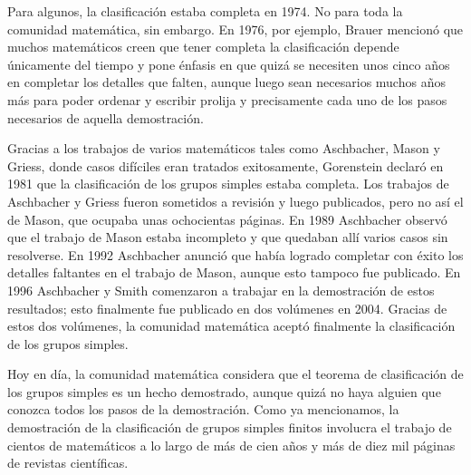 Para algunos, la clasificación estaba completa en 1974. No para toda la
comunidad matemática, sin embargo. En 1976, por ejemplo, Brauer mencionó que
muchos matemáticos creen que tener completa la clasificación depende únicamente
del tiempo y pone énfasis en
que quizá se necesiten unos cinco años en completar los detalles que falten,
aunque luego sean necesarios muchos años más para poder ordenar y escribir
prolija y precisamente cada uno de los pasos necesarios de aquella demostración. 

Gracias a los trabajos de varios matemáticos tales como Aschbacher, Mason y
Griess, donde casos difíciles eran tratados exitosamente, Gorenstein declaró en
1981 que la clasificación de los grupos simples estaba completa. Los trabajos
de Aschbacher y Griess fueron sometidos a revisión y luego publicados, pero no
así el de Mason, que ocupaba unas ochocientas páginas.  En 1989 Aschbacher
observó que el trabajo de Mason estaba incompleto y que quedaban allí varios casos
sin resolverse. En 1992 Aschbacher anunció que había logrado completar con
éxito los detalles faltantes en el trabajo de Mason, aunque esto tampoco fue
publicado. En 1996 Aschbacher y Smith comenzaron a trabajar en la demostración 
de estos resultados; esto finalmente fue publicado en dos volúmenes en 2004. Gracias
de estos dos volúmenes, 
la comunidad matemática aceptó finalmente la clasificación de los
grupos simples. 

Hoy en día, la comunidad matemática considera que el 
teorema de clasificación de los grupos
simples es un hecho demostrado, aunque quizá no haya alguien que conozca todos
los pasos de la demostración. Como ya mencionamos, la demostración 
de la clasificación de grupos simples finitos involucra el trabajo de cientos de
matemáticos a lo largo de más de cien años y más de diez mil páginas de
revistas científicas. 




